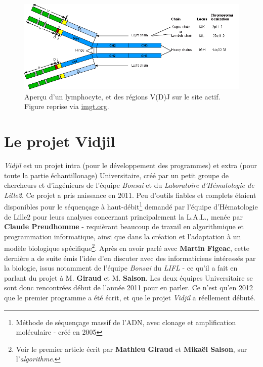 \documentclass[pdftex,12pt,a4paper]{report}
\begin{document}
\begin{spacing}{1.2}
\begin{figure}[H]
\begin{center}
	\includegraphics[scale=0.4]{img/angfig1.png}
\end{center}
\caption{Aperçu d'un lymphocyte, et des régions V(D)J sur le site actif. Figure reprise via \url{imgt.org}.}
\end{figure}

\section{Le projet Vidjil}

\textit{Vidjil} est un projet intra (pour le développement des programmes) et extra (pour toute la partie échantillonage) Universitaire, créé par un petit groupe de chercheurs et d'ingénieurs de l'équipe \textit{Bonsai} et du \textit{Laboratoire d'Hématologie de Lille2}.
\newline
Ce projet a pris naissance en 2011. Peu d'outils fiables et complets étaient disponibles pour le séquençage à haut-débit\footnote{Méthode de séquençage massif de l'ADN, avec clonage et amplification moléculaire - créé en 2005} demandé par l'équipe d'Hématologie de Lille2 pour leurs analyses concernant principalement la L.A.L., menée par \textbf{Claude Preudhomme} - requièrant beaucoup de travail en algorithmique et programmation informatique, ainsi que dans la création et l'adaptation à un modèle biologique spécifique\footnote{Voir le premier article écrit par \textbf{Mathieu Giraud} et \textbf{Mikaël Salson}, sur l'\textit{algorithme}.}.
Après en avoir parlé avec \textbf{Martin Figeac}, cette dernière a de suite émis l'idée d'en discuter avec des informaticiens intéressés par la biologie, issus notamment de l'équipe \textit{Bonsai} du \textit{LIFL} - ce qu'il a fait en parlant du projet à M. \textbf{Giraud} et M. \textbf{Salson}.
Les deux équipes Universitaire se sont donc rencontrées début de l'année 2011 pour en parler. Ce n'est qu'en 2012 que le premier programme a été écrit, et que le projet \textit{Vidjil} a réellement débuté.


\end{spacing}
\end{document}
